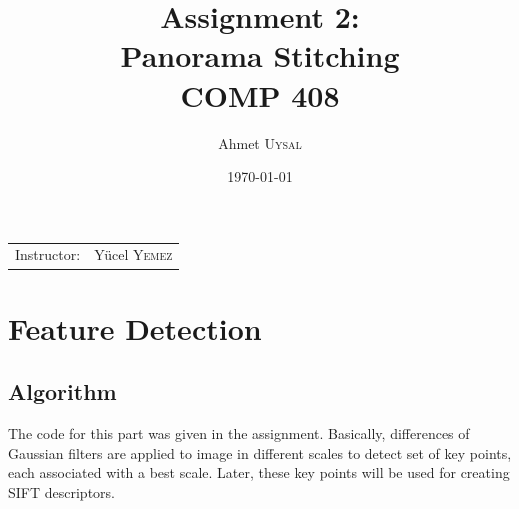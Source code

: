 \documentclass{article}
\title{Assignment 2: \\ Panorama Stitching\\ COMP 408} %
\author{Ahmet \textsc{Uysal}} %
\date{\today} %
\begin{document}
\maketitle %

\begin{center}
\begin{tabular}{l r}
Instructor: & Y\"ucel  \textsc{Yemez} %
\end{tabular}
\end{center}



\section{Feature Detection}	
\subsection{Algorithm}
The code for this part was given in the assignment. Basically, differences of Gaussian filters are applied to image in different scales to detect set of key points, each associated with a best scale. Later, these key points will be used for creating SIFT descriptors.
\end{document}
